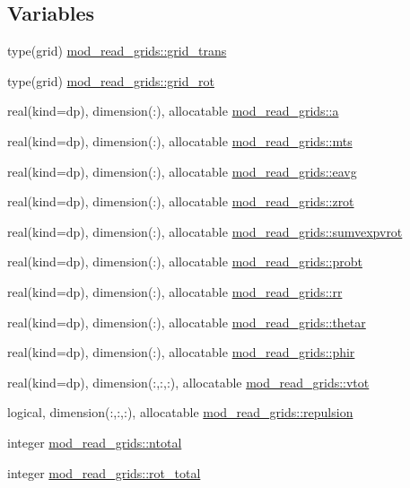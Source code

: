 \subsection*{Variables}
\begin{DoxyCompactItemize}
\item 
type(grid) \hyperlink{namespacemod__read__grids_ab09110371e13fa11f9a839bde8da8fc7}{mod\+\_\+read\+\_\+grids\+::grid\+\_\+trans}
\item 
type(grid) \hyperlink{namespacemod__read__grids_a0e370bf7268cf2484361751a7c2cbee5}{mod\+\_\+read\+\_\+grids\+::grid\+\_\+rot}
\item 
real(kind=dp), dimension(\+:), allocatable \hyperlink{namespacemod__read__grids_a1cd0dd1119fe3ce58917bf6aaf7abebf}{mod\+\_\+read\+\_\+grids\+::a}
\item 
real(kind=dp), dimension(\+:), allocatable \hyperlink{namespacemod__read__grids_af619057af0e7ce4717a95d4239422912}{mod\+\_\+read\+\_\+grids\+::mts}
\item 
real(kind=dp), dimension(\+:), allocatable \hyperlink{namespacemod__read__grids_af9747d65a3c7dd6876ab803f0a06e8e9}{mod\+\_\+read\+\_\+grids\+::eavg}
\item 
real(kind=dp), dimension(\+:), allocatable \hyperlink{namespacemod__read__grids_aa1dc0d4a91ccebc952bde4d1f380b174}{mod\+\_\+read\+\_\+grids\+::zrot}
\item 
real(kind=dp), dimension(\+:), allocatable \hyperlink{namespacemod__read__grids_aff025afae6b2b208286c65a85cd8f82a}{mod\+\_\+read\+\_\+grids\+::sumvexpvrot}
\item 
real(kind=dp), dimension(\+:), allocatable \hyperlink{namespacemod__read__grids_a019fc7a33467abb84318794f59bff9cd}{mod\+\_\+read\+\_\+grids\+::probt}
\item 
real(kind=dp), dimension(\+:), allocatable \hyperlink{namespacemod__read__grids_a668db35acd10bd5a0c686c3ea19da6c2}{mod\+\_\+read\+\_\+grids\+::rr}
\item 
real(kind=dp), dimension(\+:), allocatable \hyperlink{namespacemod__read__grids_a40918dc75ea77a2757ea8d8dd43beb9e}{mod\+\_\+read\+\_\+grids\+::thetar}
\item 
real(kind=dp), dimension(\+:), allocatable \hyperlink{namespacemod__read__grids_aa3da94e35a501dc0ed782d7019127514}{mod\+\_\+read\+\_\+grids\+::phir}
\item 
real(kind=dp), dimension(\+:,\+:,\+:), allocatable \hyperlink{namespacemod__read__grids_a1acebe9f23427d5bc54629463ab63378}{mod\+\_\+read\+\_\+grids\+::vtot}
\item 
logical, dimension(\+:,\+:,\+:), allocatable \hyperlink{namespacemod__read__grids_a78b7a722975e665430c061c6cca83ca0}{mod\+\_\+read\+\_\+grids\+::repulsion}
\item 
integer \hyperlink{namespacemod__read__grids_aa54b9eaa554b8519d41c5e616479d343}{mod\+\_\+read\+\_\+grids\+::ntotal}
\item 
integer \hyperlink{namespacemod__read__grids_aca954e32e5f53302912f372a99affe97}{mod\+\_\+read\+\_\+grids\+::rot\+\_\+total}
\end{DoxyCompactItemize}
